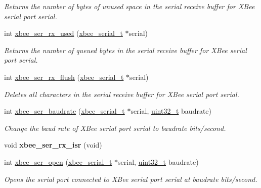 \begin{DoxyCompactItemize}
\begin{DoxyCompactList}\small\item\em Returns the number of bytes of unused space in the serial receive buffer for X\+Bee serial port {\itshape serial}. \end{DoxyCompactList}\item 
int \hyperlink{group__hal__kl25_ga43b8322771cc16b4130fa5330ad2242b}{xbee\+\_\+ser\+\_\+rx\+\_\+used} (\hyperlink{structxbee__serial__t}{xbee\+\_\+serial\+\_\+t} $\ast$serial)
\begin{DoxyCompactList}\small\item\em Returns the number of queued bytes in the serial receive buffer for X\+Bee serial port {\itshape serial}. \end{DoxyCompactList}\item 
int \hyperlink{group__hal__kl25_ga98a6d5ceb5e1445e8ef82ccaa65a8c15}{xbee\+\_\+ser\+\_\+rx\+\_\+flush} (\hyperlink{structxbee__serial__t}{xbee\+\_\+serial\+\_\+t} $\ast$serial)
\begin{DoxyCompactList}\small\item\em Deletes all characters in the serial receive buffer for X\+Bee serial port {\itshape serial}. \end{DoxyCompactList}\item 
int \hyperlink{group__hal__kl25_gab3c12543a07e0669b672c5cab54b0926}{xbee\+\_\+ser\+\_\+baudrate} (\hyperlink{structxbee__serial__t}{xbee\+\_\+serial\+\_\+t} $\ast$serial, \hyperlink{group__hal__dos_ga09a1e304d66d35dd47daffee9731edaa}{uint32\+\_\+t} baudrate)
\begin{DoxyCompactList}\small\item\em Change the baud rate of X\+Bee serial port {\itshape serial} to {\itshape baudrate} bits/second. \end{DoxyCompactList}\item 
\mbox{\label{group__hal__kl25_ga408b9fa24c27c261b6fd6fd67944fb8b}} 
void {\bfseries xbee\+\_\+ser\+\_\+rx\+\_\+isr} (void)
\item 
int \hyperlink{group__hal__kl25_gaa615a221dd69c17ee2989c281f2bf04a}{xbee\+\_\+ser\+\_\+open} (\hyperlink{structxbee__serial__t}{xbee\+\_\+serial\+\_\+t} $\ast$serial, \hyperlink{group__hal__dos_ga09a1e304d66d35dd47daffee9731edaa}{uint32\+\_\+t} baudrate)
\begin{DoxyCompactList}\small\item\em Opens the serial port connected to X\+Bee serial port {\itshape serial} at {\itshape baudrate} bits/second. \end{DoxyCompactList}\item 

\end{DoxyCompactItemize}

